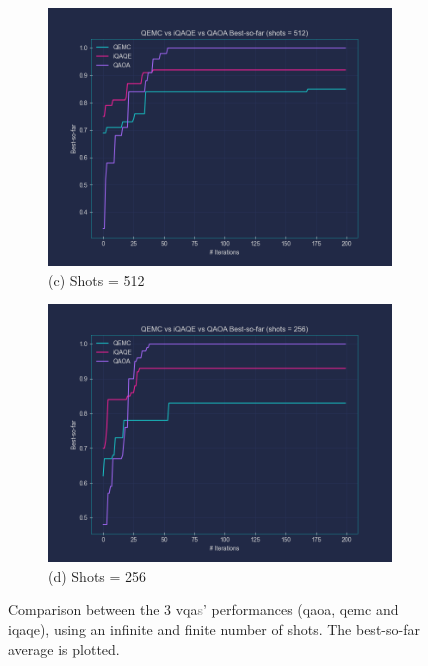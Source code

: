 \begin{figure}[ht!]
  \vspace{-1.5em} %

  \begin{subfigure}[t]{0.495\textwidth}
      \centering
      \includegraphics[width=1\textwidth]{Figures/Chapter_5/3_Comparison_shots=512.png}
      \caption*{(c) Shots = 512}
      \label{fig:3_Comparison_shots=512}
  \end{subfigure}
  \hspace{-1.5em}
  \begin{subfigure}[t]{0.495\textwidth}
      \centering
      \includegraphics[width=1\textwidth]{Figures/Chapter_5/3_Comparison_shots=256.png}
      \caption*{(d) Shots = 256}
      \label{fig:3_Comparison_shots=256}
  \end{subfigure}
  
  \caption{Comparison between the $3$ \acrshort{vqa}\textcolor{gray}{s}' performances (\acrshort{qaoa}, \acrshort{qemc} and \acrshort{iqaqe}), using an infinite and finite number of shots. The best-so-far average is plotted.}
  \label{fig:3_Comparison_shots}
\end{figure}

